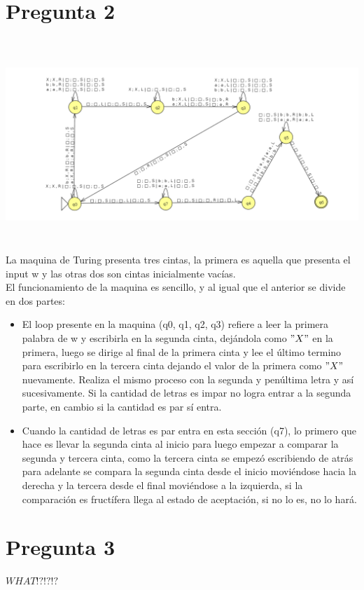 \documentclass[11pt,letterpaper]{article}
\begin{document}
\section{Pregunta 2}
\includegraphics[height=8cm]{p2.png}
La maquina de Turing presenta tres cintas, la primera es aquella que presenta el input w y las otras dos son cintas inicialmente vacías. \\
El funcionamiento de la maquina es sencillo, y al igual que el anterior se divide en dos partes:
\begin{itemize}
	\item El loop presente en la maquina (q0, q1, q2, q3) refiere a leer la primera palabra de w y escribirla en la segunda cinta, dejándola como $"X"$ en la primera, luego se dirige al final de la primera cinta y lee el último termino para escribirlo en la tercera cinta dejando el valor de la primera como $"X"$ nuevamente. Realiza el mismo proceso con la segunda y penúltima letra y así sucesivamente. Si la cantidad de letras es impar no logra entrar a la segunda parte, en cambio si la cantidad es par sí entra.
	\item Cuando la cantidad de letras es par entra en esta sección (q7), lo primero que hace es llevar la segunda cinta al inicio para luego empezar a comparar la segunda y tercera cinta, como la tercera cinta se empezó escribiendo de atrás para adelante se compara la segunda cinta desde el inicio moviéndose hacia la derecha y la tercera desde el final moviéndose a la izquierda, si la comparación es fructífera llega al estado de aceptación, si no lo es, no lo hará.
\end{itemize}

\section{Pregunta 3}
$WHAT!?!?!?$
\end{document}
